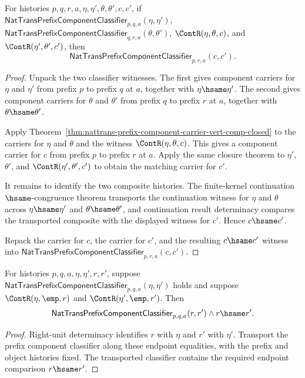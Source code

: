 \begin{theorem}
\label{thm:nattrans-prefix-component-classifier-vert-comp-congruence}
For histories $p,q,r,a,\eta,\eta',\theta,\theta',c,c'$, if
$\mathsf{NatTransPrefixComponentClassifier}_{p,q,a}(\eta,\eta')$,
$\mathsf{NatTransPrefixComponentClassifier}_{q,r,a}(\theta,\theta')$,
$\ContR(\eta,\theta,c)$, and $\ContR(\eta',\theta',c')$, then
$$
\mathsf{NatTransPrefixComponentClassifier}_{p,r,a}(c,c').
$$
\end{theorem}
\begin{proof}
Unpack the two classifier witnesses. The first gives component carriers for
$\eta$ and $\eta'$ from prefix $p$ to prefix $q$ at $a$, together with
$\eta\hsame\eta'$. The second gives component carriers for $\theta$ and
$\theta'$ from prefix $q$ to prefix $r$ at $a$, together with
$\theta\hsame\theta'$.

Apply
Theorem~\ref{thm:nattrans-prefix-component-carrier-vert-comp-closed} to the
carriers for $\eta$ and $\theta$ and the witness $\ContR(\eta,\theta,c)$.
This gives a component carrier for $c$ from prefix $p$ to prefix $r$ at $a$.
Apply the same closure theorem to $\eta'$, $\theta'$, and
$\ContR(\eta',\theta',c')$ to obtain the matching carrier for $c'$.

It remains to identify the two composite histories. The finite-kernel
continuation $\hsame$-congruence theorem transports the continuation witness
for $\eta$ and $\theta$ across $\eta\hsame\eta'$ and
$\theta\hsame\theta'$, and continuation result determinacy compares the
transported composite with the displayed witness for $c'$. Hence
$c\hsame c'$.

Repack the carrier for $c$, the carrier for $c'$, and the resulting
$c\hsame c'$ witness into
$\mathsf{NatTransPrefixComponentClassifier}_{p,r,a}(c,c')$.
\end{proof}

\begin{theorem}
\label{thm:nattrans-prefix-component-classifier-right-identity-closure}
For histories $p,q,a,\eta,\eta',r,r'$, suppose
$\mathsf{NatTransPrefixComponentClassifier}_{p,q,a}(\eta,\eta')$ holds and
suppose $\ContR(\eta,\emp,r)$ and $\ContR(\eta',\emp,r')$. Then
$$
\mathsf{NatTransPrefixComponentClassifier}_{p,q,a}(r,r')
\land r\hsame r'.
$$
\end{theorem}
\begin{proof}
Right-unit determinacy identifies $r$ with $\eta$ and $r'$ with $\eta'$.
Transport the prefix component classifier along these endpoint equalities,
with the prefix and object histories fixed. The transported classifier
contains the required endpoint comparison $r\hsame r'$.
\end{proof}

